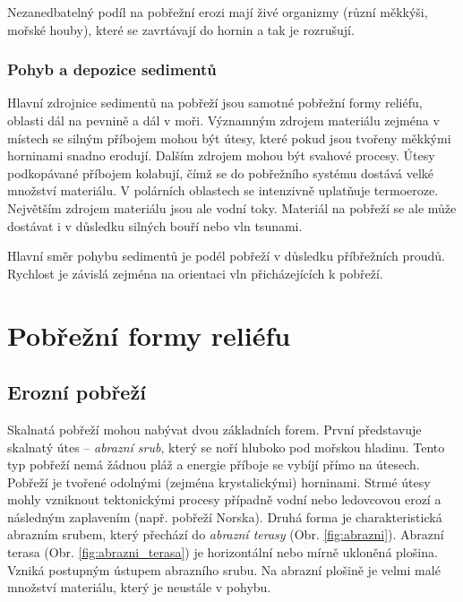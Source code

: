 Nezanedbatelný podíl na pobřežní erozi mají živé organizmy (různí měkkýši, mořské houby), které se zavrtávají do hornin a tak je rozrušují. 

\subsubsection{Pohyb a depozice sedimentů}
Hlavní zdrojnice sedimentů na pobřeží jsou samotné pobřežní formy reliéfu, oblasti dál na pevnině a dál v moři. Významným zdrojem materiálu zejména v místech se silným příbojem mohou být útesy, které pokud jsou tvořeny měkkými horninami snadno erodují. Dalším zdrojem mohou být svahové procesy. Útesy podkopávané příbojem kolabují, čímž se do pobřežního systému dostává velké množství materiálu. V polárních oblastech se intenzivně uplatňuje termoeroze. Největším zdrojem materiálu jsou ale vodní toky.  Materiál na pobřeží se ale může dostávat i v důsledku silných bouří nebo vln tsunami.

Hlavní směr pohybu sedimentů je podél pobřeží v důsledku příbřežních proudů. Rychlost je závislá zejména na orientaci vln přicházejících k pobřeží.

\section{Pobřežní formy reliéfu}

\subsection{Erozní pobřeží}
Skalnatá pobřeží mohou nabývat dvou základních forem. První představuje skalnatý útes -- \emph{abrazní srub}, který se noří hluboko pod mořskou hladinu. Tento typ pobřeží nemá žádnou pláž a energie příboje se vybíjí přímo na útesech. Pobřeží je tvořené odolnými (zejména krystalickými) horninami. Strmé útesy mohly vzniknout tektonickými procesy případně vodní nebo ledovcovou erozí a následným zaplavením (např. pobřeží Norska). Druhá forma je charakteristická abrazním srubem, který přechází do \emph{abrazní terasy} (Obr. \ref{fig:abrazni}). Abrazní terasa (Obr. \ref{fig:abrazni_terasa}) je horizontální nebo mírně ukloněná plošina. Vzniká postupným ústupem abrazního srubu. Na abrazní plošině je velmi malé množství materiálu, který je neustále v pohybu.

